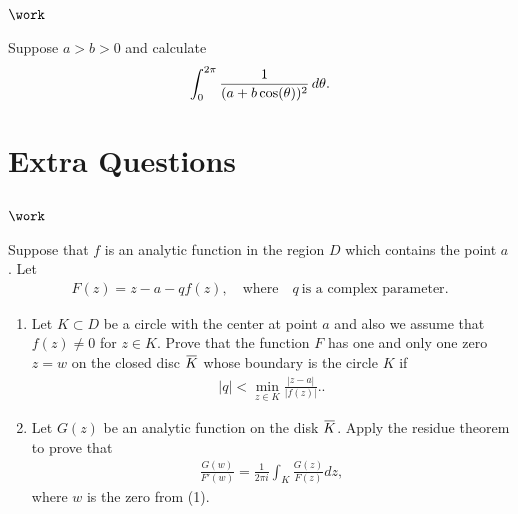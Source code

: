 \hypertarget{work-48}{%
\subsection{\texorpdfstring{\(\work\)}{\textbackslash work}}\label{work-48}}

\begin{problem}[?]

Suppose \(a>b>0\) and calculate
\begin{align*}
\int_0^{2\pi} {1 \over (a+b\cos(\theta))^2} \,d\theta
.\end{align*}

\end{problem}

\hypertarget{extra-questions}{%
\section{Extra Questions}\label{extra-questions}}

\hypertarget{work-49}{%
\subsection{\texorpdfstring{\(\work\)}{\textbackslash work}}\label{work-49}}

\begin{problem}[?]

Suppose that \(f\) is an analytic function in the region \(D\) which
contains the point \(a\). Let
\begin{align*}F(z)= z-a-qf(z),\quad \text{where}\quad q \ \text{is a complex
parameter}.\end{align*}

\begin{enumerate}
\def\labelenumi{\arabic{enumi}.}
\item
  Let \(K\subset D\) be a circle with the center at point \(a\) and also
  we assume that \(f(z)\not =0\) for \(z\in K\). Prove that the function
  \(F\) has one and only one zero \(z=w\) on the closed disc
  \(\mkern 1.5mu\overline{\mkern-1.5muK\mkern-1.5mu}\mkern 1.5mu\) whose
  boundary is the circle \(K\) if
  \begin{align*}
  \displaystyle{ |q|<\min_{z\in K} \frac{|z-a|}{|f(z)|}.}
  .\end{align*}
\item
  Let \(G(z)\) be an analytic function on the disk
  \(\mkern 1.5mu\overline{\mkern-1.5muK\mkern-1.5mu}\mkern 1.5mu\).
  Apply the residue theorem to prove that
  \begin{align*}
  \displaystyle{ \frac{G(w)}{F'(w)}=\frac{1}{2\pi i}\int_K \frac{G(z)}{F(z)} dz,}
  \end{align*}
  where \(w\) is the zero from (1).
\end{enumerate}

\end{problem}

